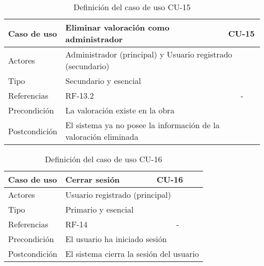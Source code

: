\begin{table}[H]
    \begin{tabular}{|p{3cm}|p{5cm}|p{2cm}|}
        \hline
        Caso de uso & Eliminar valoración como administrador & CU-15 \\
        \hline
        Actores & \multicolumn{2}{|p{7cm}|}{Administrador (principal)
        y Usuario registrado (secundario)} \\
        \hline
        Tipo & \multicolumn{2}{|p{7cm}|}{Secundario y esencial} \\
        \hline
        Referencias & RF-13.2 & \multicolumn{1}{|c|}{-} \\
        \hline
        Precondición & \multicolumn{2}{|p{7cm}|}{La valoración existe en la obra} \\
        \hline
        Postcondición & \multicolumn{2}{|p{7cm}|}{El sistema ya no posee
        la información de la valoración eliminada} \\
        \hline
    \end{tabular}
    \caption{Definición del caso de uso CU-15}
    \label{tab:cu_15}
\end{table}

\begin{table}[H]
    \begin{tabular}{|p{3cm}|p{5cm}|p{2cm}|}
        \hline
        Caso de uso & Cerrar sesión & CU-16 \\
        \hline
        Actores & \multicolumn{2}{|p{7cm}|}{Usuario registrado (principal)} \\
        \hline
        Tipo & \multicolumn{2}{|p{7cm}|}{Primario y esencial} \\
        \hline
        Referencias & RF-14 & \multicolumn{1}{|c|}{-} \\
        \hline
        Precondición & \multicolumn{2}{|p{7cm}|}{El usuario ha iniciado sesión} \\
        \hline
        Postcondición & \multicolumn{2}{|p{7cm}|}{El sistema cierra la sesión
        del usuario} \\
        \hline
    \end{tabular}
    \caption{Definición del caso de uso CU-16}
    \label{tab:cu_16}
\end{table}